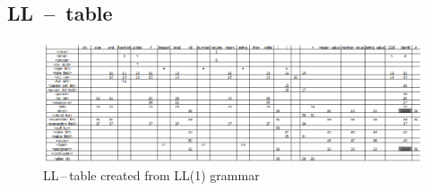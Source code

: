 \documentclass[11pt]{article}
\begin{document}
\begin{landscape}
    \section{LL\ --\ table}
    \begin{figure}[ht]
        \includegraphics[scale=1.89]{LL_tabulka.eps} 
        \caption{LL\,--\,table  created from LL(1) grammar}
    \end{figure}
\end{landscape}





\end{document}
